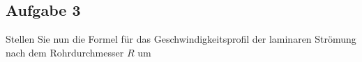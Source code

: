 \documentclass[a4paper,11pt]{article}
\newif\ifshowme
\begin{document}
\ifshowme
\antwort{
\begin{align*}
\Delta p &= \frac{8\eta \cdot \Delta l}{\pi \cdot R^4} \cdot \dot{V} \\
R &= \sqrt[4]{\frac{8\eta \cdot \Delta l}{\pi \cdot \Delta p} \cdot \dot{V}}
\end{align*}
}
\pagebreak
\else
\par \vspace*{8cm}
\fi

\subsection*{Aufgabe 3}
Stellen Sie nun die Formel für das Geschwindigkeitsprofil der laminaren Strömung nach dem Rohrdurchmesser $R$ um

\ifshowme
\antwort{
\begin{align*}
v(r) &= -\frac{R^2}{4\eta} \cdot \frac{dp}{dx} \cdot \left[ 1 - \left(\frac{r}{R}\right)^2 \right] \\
R &= \sqrt{\frac{-4\eta \cdot v(r)}{\frac{dp}{dx}} + r^2}\\
R &= \sqrt{-4\eta \cdot v(r) \cdot \frac{dx}{dp} + r^2}
\end{align*}
}
\else
\pagebreak
\fi
\end{document}
